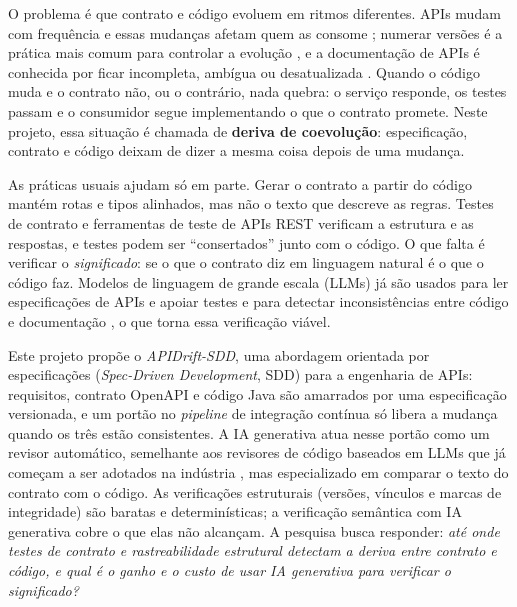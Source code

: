 \documentclass[12pt]{article}
\newcommand{\proj}{APIDrift-SDD}
\begin{document}
O problema é que contrato e código evoluem em ritmos diferentes. APIs mudam com frequência e essas mudanças afetam quem as consome \cite{lamothe2021apievolution,wang2014restevolution}; numerar versões é a prática mais comum para controlar a evolução \cite{serbout2023versioning}, e a documentação de APIs é conhecida por ficar incompleta, ambígua ou desatualizada \cite{uddin2015apidocfails,aghajani2019docissues}. Quando o código muda e o contrato não, ou o contrário, nada quebra: o serviço responde, os testes passam e o consumidor segue implementando o que o contrato promete. Neste projeto, essa situação é chamada de \textbf{deriva de coevolução}: especificação, contrato e código deixam de dizer a mesma coisa depois de uma mudança.

As práticas usuais ajudam só em parte. Gerar o contrato a partir do código mantém rotas e tipos alinhados, mas não o texto que descreve as regras. Testes de contrato e ferramentas de teste de APIs REST \cite{golmohammadi2023resttesting,atlidakis2019restler,arcuri2019evomaster,hatfield2022schemathesis} verificam a estrutura e as respostas, e testes podem ser ``consertados'' junto com o código. O que falta é verificar o \textit{significado}: se o que o contrato diz em linguagem natural é o que o código faz. Modelos de linguagem de grande escala (LLMs) já são usados para ler especificações de APIs e apoiar testes \cite{kim2024llmrest,huynh2026rbctest} e para detectar inconsistências entre código e documentação \cite{xu2025docprism,lee2025metamon}, o que torna essa verificação viável.

Este projeto propõe o \textit{\proj}, uma abordagem orientada por especificações (\textit{Spec-Driven Development}, SDD) para a engenharia de APIs: requisitos, contrato OpenAPI e código Java são amarrados por uma especificação versionada, e um portão no \textit{pipeline} de integração contínua só libera a mudança quando os três estão consistentes. A IA generativa atua nesse portão como um revisor automático, semelhante aos revisores de código baseados em LLMs que já começam a ser adotados na indústria \cite{cihan2025acr}, mas especializado em comparar o texto do contrato com o código. As verificações estruturais (versões, vínculos e marcas de integridade) são baratas e determinísticas; a verificação semântica com IA generativa cobre o que elas não alcançam. A pesquisa busca responder: \textit{até onde testes de contrato e rastreabilidade estrutural detectam a deriva entre contrato e código, e qual é o ganho e o custo de usar IA generativa para verificar o significado?}
\end{document}
